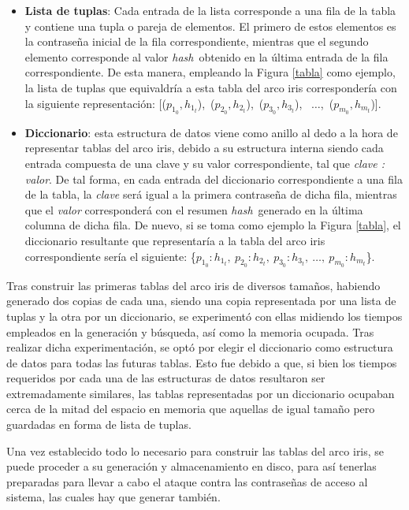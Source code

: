 \documentclass[12pt,spanish,listoffigures,listoftables,listofalgorithms]{tfgetsinf}
\newcommand{\hash}{\textit{hash}}
\begin{document}
\begin{itemize}

    \item \textbf{Lista de tuplas}: Cada entrada de la lista corresponde a una fila de la tabla y contiene una tupla o pareja de elementos. El primero de estos elementos es la contraseña inicial de la fila correspondiente, mientras que el segundo elemento corresponde al valor \hash~obtenido en la última entrada de la fila correspondiente. De esta manera, empleando la Figura \ref{tabla} como ejemplo, la lista de tuplas que equivaldría a esta tabla del arco iris correspondería con la siguiente representación: [($p_{1_0}, h_{1_t}$),~($p_{2_0}, h_{2_t}$),~($p_{3_0}, h_{3_t}$), ~$\dots$,~($p_{m_0}, h_{m_t}$)].
    
    \item \textbf{Diccionario}: esta estructura de datos viene como anillo al dedo a la hora de representar tablas del arco iris, debido a su estructura interna siendo cada entrada compuesta de una clave y su valor correspondiente, tal que \textit{clave : valor}. De tal forma, en cada entrada del diccionario correspondiente a una fila de la tabla, la \textit{clave} será igual a la primera contraseña de dicha fila, mientras que el \textit{valor} corresponderá con el resumen \hash~generado en la última columna de dicha fila. De nuevo, si se toma como ejemplo la Figura \ref{tabla}, el diccionario resultante que representaría a la tabla del arco iris correspondiente sería el siguiente: \{$p_{1_0} : h_{1_t},~p_{2_0} : h_{2_t},~p_{3_0} : h_{3_t}, ~\dots,~p_{m_0} : h_{m_t}$\}.
    
\end{itemize}

Tras construir las primeras tablas del arco iris de diversos tamaños, habiendo generado dos copias de cada una, siendo una copia representada por una lista de tuplas y la otra por un diccionario, se experimentó con ellas midiendo los tiempos empleados en la generación y búsqueda, así como la memoria ocupada. Tras realizar dicha experimentación, se optó por elegir el diccionario como estructura de datos para todas las futuras tablas. Esto fue debido a que, si bien los tiempos requeridos por cada una de las estructuras de datos resultaron ser extremadamente similares, las tablas representadas por un diccionario ocupaban cerca de la mitad del espacio en memoria que aquellas de igual tamaño pero guardadas en forma de lista de tuplas.

Una vez establecido todo lo necesario para construir las tablas del arco iris, se puede proceder a su generación y almacenamiento en disco, para así tenerlas preparadas para llevar a cabo el ataque contra las contraseñas de acceso al sistema, las cuales hay que generar también.
\end{document}

